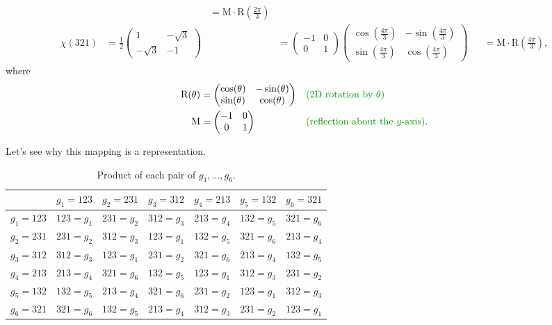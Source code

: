 \documentclass[12pt]{extarticle}
\begin{document}
\begin{align*}
&& = \text{M} \cdot \text{R}(\frac{2\pi}{3}) \\
\chi(321) & = \frac{1}{2} \begin{pmatrix} 1 & -\sqrt{3} \\ -\sqrt{3} & -1 \end{pmatrix}
&& = \begin{pmatrix}-1 & 0 \\ 0 & 1\end{pmatrix} \begin{pmatrix} \cos(\frac{4\pi}{3}) & -\sin(\frac{4\pi}{3}) \\ \sin(\frac{4\pi}{3}) & \cos(\frac{4\pi}{3}) \end{pmatrix}
&& = \text{M} \cdot \text{R}(\frac{4\pi}{3}),
\end{align*}
where
\begin{align*}
\text{R}(\theta) & = \begin{pmatrix} \cos(\theta) & -\sin(\theta) \\ \sin(\theta) & \cos(\theta) \end{pmatrix} && \expl{2D rotation by $\theta$} \\
\text{M} & = \begin{pmatrix} -1 & 0 \\ 0 & 1 \end{pmatrix} && \expl{reflection about the $y$-axis}.
\end{align*}

Let's see why this mapping is a representation.
\begin{table}[h!]
    \centering
    \begin{footnotesize}
        \begin{tabular}{c|c|c|c|c|c|c}
            & $g_1=123$ & $g_2=231$ & $g_3=312$ & $g_4=213$ & $g_5=132$ & $g_6=321$ \\
            \hline
            $g_1=123$ & $123=g_1$ & $231=g_2$ & $312=g_3$ & $213=g_4$ & $132=g_5$ & $321=g_6$ \\
            $g_2=231$ & $231=g_2$ & $312=g_3$ & $123=g_1$ & $132=g_5$ & $321=g_6$ & $213=g_4$ \\
            $g_3=312$ & $312=g_3$ & $123=g_1$ & $231=g_2$ & $321=g_6$ & $213=g_4$ & $132=g_5$ \\
            $g_4=213$ & $213=g_4$ & $321=g_6$ & $132=g_5$ & $123=g_1$ & $312=g_3$ & $231=g_2$ \\
            $g_5=132$ & $132=g_5$ & $213=g_4$ & $321=g_6$ & $231=g_2$ & $123=g_1$ & $312=g_3$ \\
            $g_6=321$ & $321=g_6$ & $132=g_5$ & $213=g_4$ & $312=g_3$ & $231=g_2$ & $123=g_1$ \\
        \end{tabular}
    \end{footnotesize}
    \caption{Product of each pair of $g_1, \ldots, g_6$.}
    \label{tab:permutationproducts}
\end{table}
\end{document}
